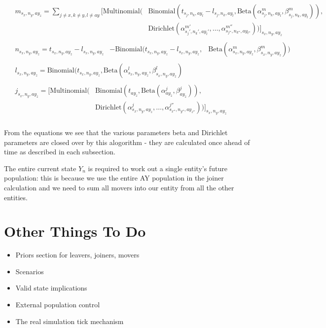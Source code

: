 \documentclass[margin=5mm]{article}
\begin{document}
\begin{equation*}
\begin{aligned}
& \begin{split}
    m_{s_x,n_y,ay_z} = \sum_{j \neq x, k \neq y , l \neq ay }\bigg[
        \text{Multinomial}( & \text{Binomial}(t_{s_j,n_k,ay_l} - l_{s_j,n_k,ay_l}, 
        \text{Beta}(\alpha^m_{s_j,n_k,ay_l},\beta^m_{s_j,n_k,ay_l})),
        \\ &  \text{Dirichlet}(\alpha^{m'}_{s_j',n_k',ay_l'}, \dots,
        \alpha^{m''}_{s_{j''},n_{k''},ay_{l''}}))\bigg]_{s_x,n_y,ay_z}
\end{split}\\ 
& \begin{split}
    n_{s_x,n_y,ay_z} = t_{s_x,n_y,ay_z}  - l_{s_x,n_y,ay_z} & - \text{Binomial}(t_{s_x,n_y,ay_z} - l_{s_x,n_y,ay_z}, 
    & \text{Beta}(\alpha^m_{s_x,n_y,ay_z},\beta^m_{s_x,n_y,ay_z})) 
  \end{split}\\
& \begin{split}
  l_{s_x,n_y,ay_z} =
  \text{Binomial}(t_{s_x,n_y,ay_z},\text{Beta}(\alpha^l_{s_x,n_y,ay_z},
  \beta^l_{s_x,n_y,ay_z})
\end{split}\\
& \begin{split}
j_{s_x,n_y,ay_z} = \bigg[\text{Multinomial}( & \text{Binomial}( t_{ay_z},
\text{Beta}(\alpha^j_{ay_z},\beta^j_{ay_z})), \\
& \text{Dirichlet}(\alpha^{j}_{s_x,n_y,ay_z}, \dots
, \alpha^{j''}_{s_{x''},n_{y''},ay_{z''}}))\bigg]_{s_x,n_y,ay_z}
\end{split}\\
\end{aligned}
\end{equation*}

From the equations we see that the various parameters beta and
Dirichlet parameters are closed over by this alogorithm - they are
calculated once ahead of time as described in each subsection.

The entire current state $Y_n$ is required to work out a single
entity's future population: this is because we use the entire AY
population in the joiner calculation and we need to sum all movers
into our entity from all the other entities.

\section{Other Things To Do}

\begin{itemize}
\item Priors section for leavers, joiners, movers
\item Scenarios
\item Valid state implications
\item External population control
\item The real simulation tick mechanism
\end{itemize}
\end{document}
